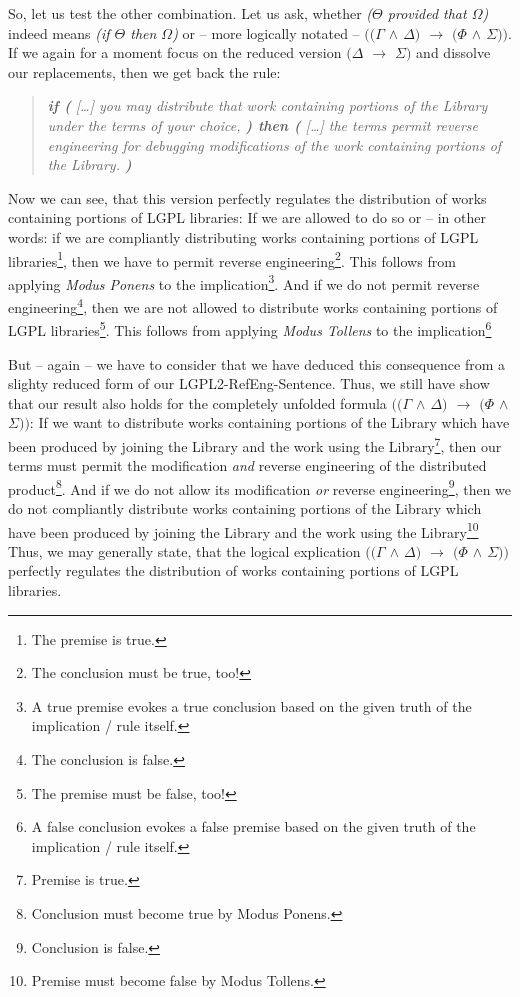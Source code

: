 So, let us test the other combination. Let us ask, whether \emph{($\Theta$
provided that $\Omega$)} indeed means \emph{(if $\Theta$ then $\Omega$)} or --
more logically notated -- \emph{$((\Gamma$ $\wedge$ $\Delta)$ $\rightarrow$ $(\Phi$
$\wedge$ $\Sigma))$}. If we again for a moment focus on the reduced version
\emph{$(\Delta$ $\rightarrow$ $\Sigma)$} and dissolve our replacements, then we
get back the rule:

\begin{quote}\noindent\emph{\textbf{if (} [\ldots] you may distribute that work
containing portions of the Library under the terms of your choice, \textbf{)
then (} [\ldots] the terms permit reverse engineering for debugging
modifications of the work containing portions of the Library.
\textbf{)}}\end{quote}

Now we can see, that this version perfectly regulates the distribution of works
containing portions of LGPL libraries: If we are allowed to do so or -- in other
words: if we are compliantly distributing works containing portions of LGPL
libraries\footnote{The premise is true.}, then we have to permit reverse
engineering\footnote{The conclusion must be true, too!}. This follows from
applying \emph{Modus Ponens} to the implication\footnote{A true premise evokes a
true conclusion based on the given truth of the implication / rule itself.}. And
if we do not permit reverse engineering\footnote{The conclusion is false.}, then
we are not allowed to distribute works containing portions of LGPL
libraries\footnote{The premise must be false, too!}. This follows from applying
\emph{Modus Tollens} to the implication\footnote{A false conclusion evokes a
false premise based on the given truth of the implication / rule itself.}

But -- again -- we have to consider that we have deduced this consequence from a
slighty reduced form of our LGPL2-RefEng-Sentence. Thus, we still have show that
our result also holds for the completely unfolded formula \emph{$((\Gamma$
$\wedge$ $\Delta)$ $\rightarrow$ $(\Phi$ $\wedge$ $\Sigma))$}: If we want to
distribute works containing portions of the Library which have been produced by
joining the Library and the work using the Library\footnote{Premise is true.},
then our terms must permit the modification \emph{and} reverse engineering of
the distributed product\footnote{Conclusion must become true by Modus Ponens.}.
And if we do not allow its modification \emph{or} reverse
engineering\footnote{Conclusion is false.}, then we do not compliantly
distribute works containing portions of the Library which have been produced by
joining the Library and the work using the Library\footnote{Premise must become
false by Modus Tollens.} Thus, we may generally state, that the logical
explication \emph{$((\Gamma$ $\wedge$ $\Delta)$ $\rightarrow$ $(\Phi$ $\wedge$
$\Sigma))$} perfectly regulates the distribution of works containing portions of
LGPL libraries.

